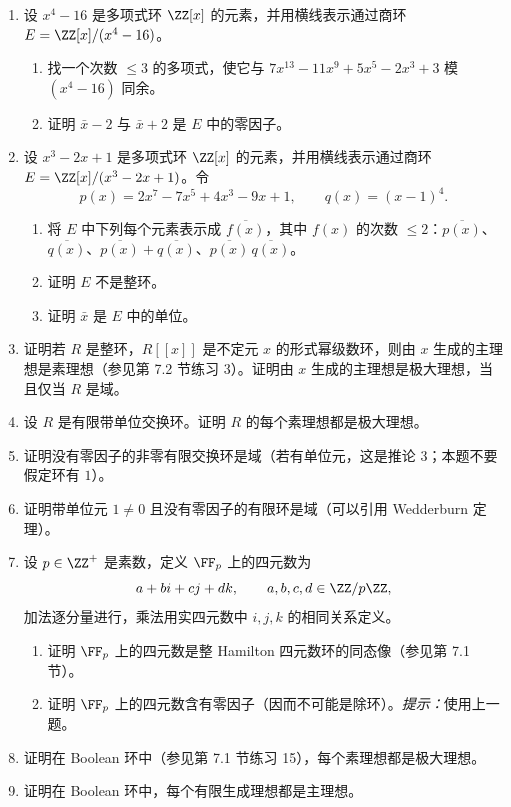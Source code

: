 \begin{enumerate}[label=\arabic*.]
\begin{enumerate}[label=(\alph*)]
	\end{enumerate}
	\item 设 $x^4-16$ 是多项式环 $\ZZ[x]$ 的元素，并用横线表示通过商环 $E=\ZZ[x]/(x^4-16)$。
	\begin{enumerate}[label=(\alph*)]
		\item 找一个次数 $\leq3$ 的多项式，使它与 $7x^{13}-11x^9+5x^5-2x^3+3$ 模 $(x^4-16)$ 同余。
		\item 证明 $\bar x-2$ 与 $\bar x+2$ 是 $E$ 中的零因子。
	\end{enumerate}
	\item 设 $x^3-2x+1$ 是多项式环 $\ZZ[x]$ 的元素，并用横线表示通过商环 $E=\ZZ[x]/(x^3-2x+1)$。令
	\[
	p(x)=2x^7-7x^5+4x^3-9x+1,
	\qquad q(x)=(x-1)^4.
	\]
	\begin{enumerate}[label=(\alph*)]
		\item 将 $E$ 中下列每个元素表示成 $\overline{f(x)}$，其中 $f(x)$ 的次数 $\leq2$：$\overline{p(x)}$、$\overline{q(x)}$、$\overline{p(x)}+\overline{q(x)}$、$\overline{p(x)}\,\overline{q(x)}$。
		\item 证明 $E$ 不是整环。
		\item 证明 $\bar x$ 是 $E$ 中的单位。
	\end{enumerate}
	\item 证明若 $R$ 是整环，$R[[x]]$ 是不定元 $x$ 的形式幂级数环，则由 $x$ 生成的主理想是素理想（参见第 7.2 节练习 3）。证明由 $x$ 生成的主理想是极大理想，当且仅当 $R$ 是域。
	\item 设 $R$ 是有限带单位交换环。证明 $R$ 的每个素理想都是极大理想。
	\item 证明没有零因子的非零有限交换环是域（若有单位元，这是推论 3；本题不要假定环有 $1$）。
	\item 证明带单位元 $1\neq0$ 且没有零因子的有限环是域（可以引用 Wedderburn 定理）。
	\item 设 $p\in\ZZ^+$ 是素数，定义 $\FF_p$ 上的四元数为
	\[
	a+bi+cj+dk,
	\qquad a,b,c,d\in\ZZ/p\ZZ,
	\]
	加法逐分量进行，乘法用实四元数中 $i,j,k$ 的相同关系定义。
	\begin{enumerate}[label=(\alph*)]
		\item 证明 $\FF_p$ 上的四元数是整 Hamilton 四元数环的同态像（参见第 7.1 节）。
		\item 证明 $\FF_p$ 上的四元数含有零因子（因而不可能是除环）。\emph{提示：}使用上一题。
	\end{enumerate}
	\item 证明在 Boolean 环中（参见第 7.1 节练习 15），每个素理想都是极大理想。
	\item 证明在 Boolean 环中，每个有限生成理想都是主理想。

\end{enumerate}
